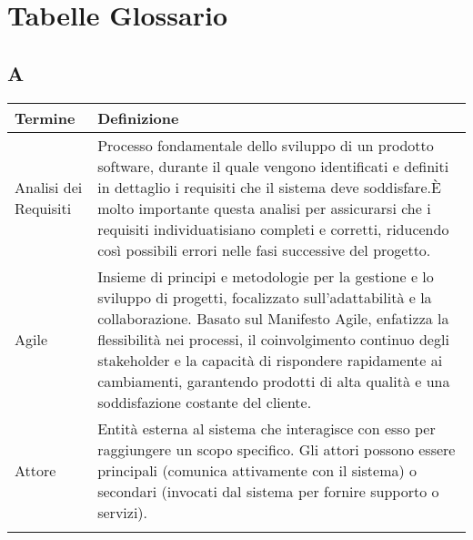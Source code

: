 \documentclass[10pt]{article}
\begin{document}
\newpage
\section{Tabelle Glossario}

\vspace{2mm}
\renewcommand{\arraystretch}{1.5} %
\setlength{\tabcolsep}{10pt} %


\subsection{A} %
\begin{tabularx}{\textwidth}{|>{\centering\arraybackslash}l|X|}
\hline
\rowcolor[gray]{0.8}
\textbf{Termine} & \textbf{Definizione}\\
\hline
Analisi dei Requisiti & Processo fondamentale dello sviluppo di un prodotto software, durante il quale vengono identificati e definiti in dettaglio i requisiti che il sistema deve soddisfare.\newline È molto importante questa analisi per assicurarsi che i requisiti individuatisiano completi e corretti, riducendo così possibili errori nelle fasi successive del progetto.\\
\hline
Agile & Insieme di principi e metodologie per la gestione e lo sviluppo di progetti, focalizzato sull'adattabilità e la collaborazione. Basato sul Manifesto Agile, enfatizza la flessibilità nei processi, il coinvolgimento continuo degli stakeholder e la capacità di rispondere rapidamente ai cambiamenti, garantendo prodotti di alta qualità e una soddisfazione costante del cliente.\\
\hline
Attore & Entità esterna al sistema che interagisce con esso per raggiungere un scopo specifico. Gli attori possono essere principali (comunica attivamente con il sistema) o secondari (invocati dal sistema per fornire supporto o servizi).\\
\hline
& \\
\hline
\end{tabularx}
\end{document}
